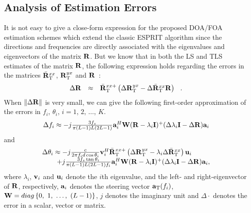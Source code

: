 \documentclass[conference]{IEEEtran}
\newcommand{\ba}{{\bf a}}
\newcommand{\bu}{{\bf u}}
\newcommand{\bv}{{\bf v}}
\newcommand{\bI}{{\bf I}}
\newcommand{\bR}{{\bf R}}
\newcommand{\bW}{{\bf W}}
\begin{document}
\subsection{Analysis of Estimation Errors}
It is not easy to give a close-form expression for the proposed
DOA/FOA estimation schemes which extend the classic ESPRIT
algorithm since the directions and frequencies are directly
associated with the eigenvalues and eigenvectors of the matrix
$\bR$. But we know that in both the LS and TLS estimates of the
matrix $\bR$, the following expression holds regarding the errors
in the matrices $\bar{\bR}_{\rm T}^{xx}$, $\bR_{\rm T}^{yx}$ and
$\bR$~\cite{Rao89}:
\begin{equation}
\begin{array}{rcl}
\Delta\bR&\approx&\bar{\bR}_{\rm T}^{xx+}\left(\Delta\bR_{\rm
T}^{yx}-\Delta\bar{\bR}_{\rm T}^{xx}\bR\right)\hspace{0.1in}.
\end{array}\label{DeltaR}
\end{equation}
\noindent When $\|\Delta\bR\|$ is very small, we can give the
following first-order approximation of the errors in $f_i$,
$\theta_i$, $i=1$, $2$, $\ldots$, $K$.
\begin{equation}
\begin{array}{l}
\Delta f_i\approx
-j{3f_s\over\pi(L-1)L(2L-1)}\ba_i^H\bW(\bR-\lambda_i\bI)^{+}(\Delta\lambda_i\bI-\Delta\bR)\ba_i
\end{array}\label{approx_theta}
\end{equation}
\noindent and
\begin{equation}
\begin{array}{l}
\Delta\theta_i \approx -j{c\over 2\pi
f_id\cos\theta_i}\bv_i^H\bar{\bR}_{\rm T}^{xx+}\left(\Delta\bR_{\rm T}^{yx}-\lambda_i\Delta\bar{\bR}_{\rm T}^{xx}\right)\bu_i\\
\hspace{0.3in}+j{3f_s\tan\theta_i\over\pi(L-1)L(2L-1)f_i}\ba_i^H\bW(\bR-\lambda_i\bI)^{+}(\Delta\lambda_i\bI-\Delta\bR)\ba_i,
\end{array}\label{approx_f}
\end{equation}
\noindent where $\lambda_i$, $\bv_i$ and $\bu_i$ denote the $i$th
eigenvalue, and the left- and right-eigenvector of $\bR$,
respectively, $\ba_i$ denotes the steering vector $\ba_{\rm
T}(f_i)$, $\bW=\mbox{diag}\left\{0,\ 1,\ \ldots,\ (L-1)\right\}$,
$j$ denotes the imaginary unit and $\Delta\cdot$ denotes the error
in a scalar, vector or matrix.
\end{document}
